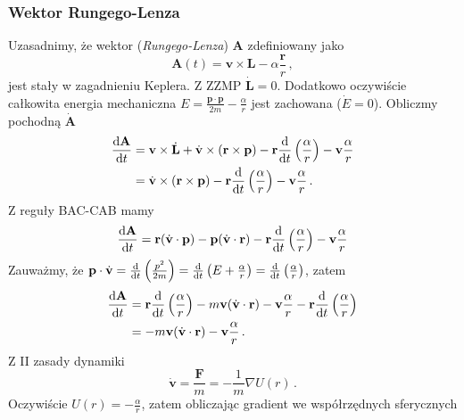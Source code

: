 \documentclass[../main.tex]{subfiles}
\begin{document}
\subsubsection{Wektor Rungego-Lenza}
Uzasadnimy, że wektor (\textit{Rungego-Lenza}) \(\mathbf{A}\) zdefiniowany jako
\begin{equation*}
    \mathbf{A}(t)=\mathbf{v}\times\mathbf{L}-\alpha\frac{\mathbf{r}}{r}\,,
\end{equation*}
 jest stały w zagadnieniu Keplera. Z ZZMP \(\dot{\mathbf{L}}=0\). Dodatkowo oczywiście całkowita
 energia mechaniczna \(E=\frac{\mathbf{p}\cdot\mathbf{p}}{2m}-\frac{\alpha}{r}\) jest zachowana
 (\(\dot E=0\)). Obliczmy pochodną \(\dot{\mathbf{A}}\)
\begin{equation*}
\begin{split}
    \dv{\mathbf{A}}{t}&=\mathbf{v}\times\dot{\mathbf{L}}+\dot{\mathbf{v}}\times (\mathbf{r}\times \mathbf{p})-\mathbf{r}\dv{}{t}\left(\frac{\alpha}{r}\right)-\mathbf{v}\frac{\alpha}{r}\\
    &=\dot{\mathbf{v}}\times (\mathbf{r}\times \mathbf{p})-\mathbf{r}\dv{}{t}\left(\frac{\alpha}{r}\right)-\mathbf{v}\frac{\alpha}{r}\,.
\end{split}
\end{equation*}
Z reguły BAC-CAB mamy
\begin{equation*}
    \dv{\mathbf{A}}{t}=\mathbf{r}(\dot{\mathbf{v}}\cdot \mathbf{p})-\mathbf{p}(\dot{\mathbf{v}}\cdot \mathbf{r})-\mathbf{r}\dv{}{t}\left(\frac{\alpha}{r}\right)-\mathbf{v}\frac{\alpha}{r}
\end{equation*}
Zauważmy, że
\(\mathbf{p}\cdot\dot{\mathbf{v}}=\dv{}{t}\left(\frac{p^2}{2m}\right)=\dv{}{t}\left(E+\frac{\alpha}{r}\right)=\dv{}{t}\left(\frac{\alpha}{r}\right)\),
zatem
\begin{equation*}
\begin{split}
    \dv{\mathbf{A}}{t}&=\mathbf{r}\dv{}{t}\left(\frac{\alpha}{r}\right)-m\mathbf{v}(\dot{\mathbf{v}}\cdot \mathbf{r})-\mathbf{v}\frac{\alpha}{r}-\mathbf{r}\dv{}{t}\left(\frac{\alpha}{r}\right)\\
    &=-m\mathbf{v}(\dot{\mathbf{v}}\cdot \mathbf{r})-\mathbf{v}\frac{\alpha}{r}\,.
\end{split}
\end{equation*}
Z II zasady dynamiki
\begin{equation*}
    \dot{\mathbf{v}}=\frac{\mathbf{F}}{m}=-\frac{1}{m}\nabla U(r)\,.
\end{equation*}
Oczywiście \(U(r)=-\frac{\alpha}{r}\), zatem obliczając gradient we współrzędnych sferycznych
\end{document}

